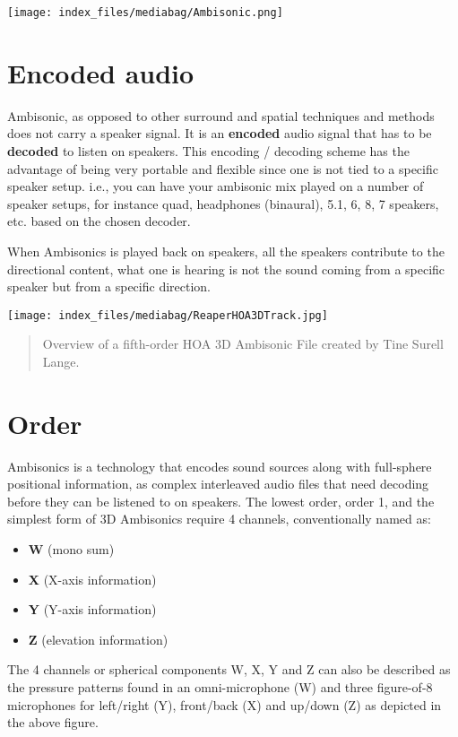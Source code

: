 \documentclass[
  letterpaper,
  DIV=11,
  numbers=noendperiod]{scrreport}
\providecommand{\tightlist}{%
  \setlength{\itemsep}{0pt}\setlength{\parskip}{0pt}}\usepackage{longtable,booktabs,array}
\begin{document}
\texttt{[image: index\_files/mediabag/Ambisonic.png]}

\hypertarget{encoded-audio}{%
\section{Encoded audio}\label{encoded-audio}}

Ambisonic, as opposed to other surround and spatial techniques and
methods does not carry a speaker signal. It is an \textbf{encoded} audio
signal that has to be \textbf{decoded} to listen on speakers. This
encoding / decoding scheme has the advantage of being very portable and
flexible since one is not tied to a specific speaker setup. i.e., you
can have your ambisonic mix played on a number of speaker setups, for
instance quad, headphones (binaural), 5.1, 6, 8, 7 speakers, etc. based
on the chosen decoder.

When Ambisonics is played back on speakers, all the speakers contribute
to the directional content, what one is hearing is not the sound coming
from a specific speaker but from a specific direction.

\texttt{[image: index\_files/mediabag/ReaperHOA3DTrack.jpg]}

\begin{quote}
Overview of a fifth-order HOA 3D Ambisonic File created by Tine Surell
Lange.
\end{quote}

\hypertarget{order}{%
\section{Order}\label{order}}

Ambisonics is a technology that encodes sound sources along with
full-sphere positional information, as complex interleaved audio files
that need decoding before they can be listened to on speakers. The
lowest order, order 1, and the simplest form of 3D Ambisonics require 4
channels, conventionally named as:

\begin{itemize}
\tightlist
\item
  \textbf{W} (mono sum)
\item
  \textbf{X} (X-axis information)
\item
  \textbf{Y} (Y-axis information)
\item
  \textbf{Z} (elevation information)
\end{itemize}

The 4 channels or spherical components W, X, Y and Z can also be
described as the pressure patterns found in an omni-microphone (W) and
three figure-of-8 microphones for left/right (Y), front/back (X) and
up/down (Z) as depicted in the above figure.
\end{document}
